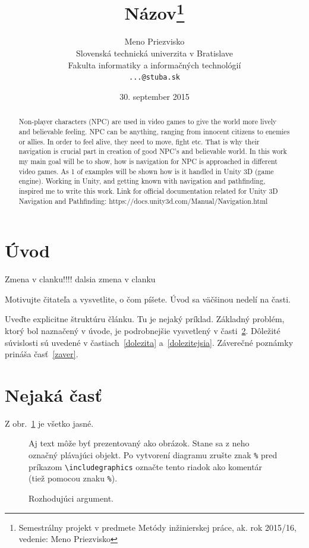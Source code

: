 \documentclass[10pt,twoside,slovak,a4paper]{coursepaper}
\title{Názov\thanks{Semestrálny projekt v predmete Metódy inžinierskej práce, ak. rok 2015/16, vedenie: Meno Priezvisko}} %
\author{Meno Priezvisko\\[2pt]
	{\small Slovenská technická univerzita v Bratislave}\\
	{\small Fakulta informatiky a informačných technológií}\\
	{\small \texttt{...@stuba.sk}}
	}
\date{\small 30. september 2015} %
\begin{document}
\maketitle

\begin{abstract}

Non-player characters (NPC) are used in video games to give the world more lively and believable feeling. NPC can be anything, ranging from innocent citizens to enemies or allies. In order to feel alive, they need to move, fight etc. That is why their navigation is crucial part in creation of good NPC’s and believable world. In this work my main goal will be to show, how is navigation for NPC is approached in different video games. As 1 of examples will be shown how is it handled in Unity 3D (game engine). Working in Unity, and getting known with navigation and pathfinding, inspired me to write this work.  
Link for official documentation related for Unity 3D Navigation and Pathfinding: https://docs.unity3d.com/Manual/Navigation.html

\end{abstract}



\section{Úvod}

Zmena v clanku!!!!
dalsia zmena v clanku

Motivujte čitateľa a vysvetlite, o čom píšete. Úvod sa väčšinou nedelí na časti.

Uveďte explicitne štruktúru článku. Tu je nejaký príklad.
Základný problém, ktorý bol naznačený v úvode, je podrobnejšie vysvetlený v časti~\ref{nejaka}.
Dôležité súvislosti sú uvedené v častiach~\ref{dolezita} a~\ref{dolezitejsia}.
Záverečné poznámky prináša časť~\ref{zaver}.



\section{Nejaká časť} \label{nejaka}

Z obr.~\ref{f:rozhod} je všetko jasné. 

\begin{figure}[tbh]
\centering
Aj text môže byť prezentovaný ako obrázok. Stane sa z neho označný plávajúci objekt. Po vytvorení diagramu zrušte znak \texttt{\%} pred príkazom \verb|\includegraphics| označte tento riadok ako komentár (tiež pomocou znaku \texttt{\%}).
\caption{Rozhodujúci argument.}
\label{f:rozhod}
\end{figure}
\end{document}

